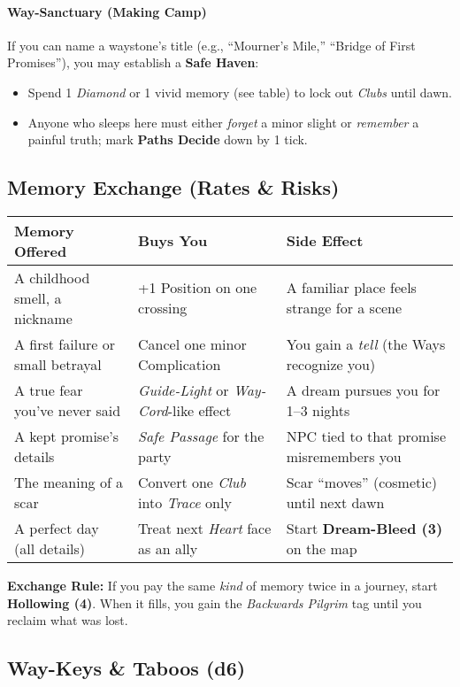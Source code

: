 \paragraph{Way-Sanctuary (Making Camp)}
If you can name a waystone’s title (e.g., “Mourner’s Mile,” “Bridge of First Promises”), you may establish a \textbf{Safe Haven}:
\begin{itemize}
  \item Spend 1 \emph{Diamond} or 1 vivid memory (see table) to lock out \emph{Clubs} until dawn.
  \item Anyone who sleeps here must either \emph{forget} a minor slight or \emph{remember} a painful truth; mark \textbf{Paths Decide} down by 1 tick.
\end{itemize}
\subsection*{Memory Exchange (Rates \& Risks)}

\begin{tabular}{p{} p{} p{}}
\textbf{Memory Offered} & \textbf{Buys You} & \textbf{Side Effect} \\
\hline
A childhood smell, a nickname & +1 Position on one crossing & A familiar place feels strange for a scene \\
A first failure or small betrayal & Cancel one minor Complication & You gain a \emph{tell} (the Ways recognize you) \\
A true fear you’ve never said & \emph{Guide-Light} or \emph{Way-Cord}-like effect & A dream pursues you for 1–3 nights \\
A kept promise’s details & \emph{Safe Passage} for the party & NPC tied to that promise misremembers you \\
The meaning of a scar & Convert one \emph{Club} into \emph{Trace} only & Scar “moves” (cosmetic) until next dawn \\
A perfect day (all details) & Treat next \emph{Heart} face as an ally & Start \textbf{Dream-Bleed (3)} on the map \\
\end{tabular}

\medskip

\textbf{Exchange Rule:} If you pay the same \emph{kind} of memory twice in a journey, start \textbf{Hollowing (4)}. When it fills, you gain the \emph{Backwards Pilgrim} tag until you reclaim what was lost.
\subsection*{Way-Keys \& Taboos (d6)}

